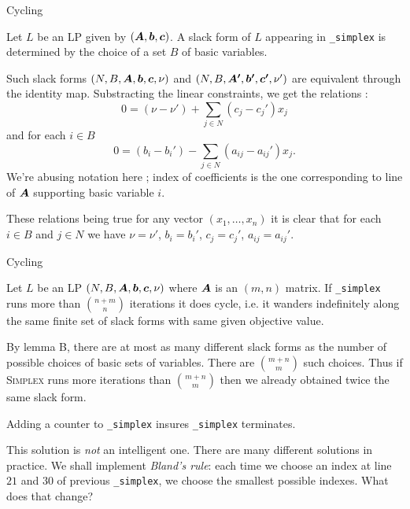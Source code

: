 \documentclass[aspectratio = 169]{beamer}
\begin{document}
    \begin{frame}{Cycling}
        \begin{lem}[$\bs{B}$]
          Let $L$ be an LP given by $(\boldsymbol{A}, \boldsymbol{b}, \boldsymbol{c})$. A
          slack form of $L$ appearing in \texttt{_simplex}
          is determined by the choice of a set $B$ of basic variables.
        \end{lem}
        \pause
        \setlength\columnseprule{.1pt}
        \begin{multicols}{2}
            \begin{demo}
              Such slack forms $(N, B, \boldsymbol{A}, \boldsymbol{b}, \boldsymbol{c}, \nu)$
              and $(N, B, \boldsymbol{A'}, \boldsymbol{b'}, \boldsymbol{c'}, \nu')$ are
              equivalent through the identity map.  \pause
              Substracting the linear constraints, we get the
              relations :
              \[
              0 = (\nu - \nu') + \sum_{j \in N} (c_j - c_j')x_j
              \]
              and for each $i \in B$
              \[
              0 = (b_i - b_i') - \sum_{j \in N} (a_{ij} - a_{ij}')x_j.
              \]
              We're abusing notation here ; index of coefficients is
              the one corresponding to line of $\boldsymbol{A}$ supporting
              basic variable $i$.

              \pause These relations being true for any vector
              $(x_1, \ldots, x_n)$ it is clear that for each $i \in B$
              and $j \in N$ we have  $\nu = \nu'$, $b_i = b_i'$, $c_j = c_j'$,
              $a_{ij} = a_{ij}'$.
            \end{demo}
        \end{multicols}
    \end{frame}

\begin{frame}{Cycling}
  \begin{prop}[\textbf{C}]
    Let $L$ be an LP $(N, B, \boldsymbol{A}, \boldsymbol{b}, \boldsymbol{c}, \nu)$ where
    $\boldsymbol{A}$ is an $(m, n)$ matrix. If \texttt{_simplex}
    runs more than $\binom{n+m}{n}$ iterations it does cycle, i.e. it
    wanders indefinitely along the same finite set of slack forms with
    same given objective value.
  \end{prop}
  \begin{demo}
    By lemma B, there are at most as many different slack forms
    as the number of possible choices of basic sets of
    variables. There are $\binom{m+n}{m}$ such choices. Thus if
    \textsc{Simplex} runs more iterations than $\binom{m+n}{m}$
    then we already obtained twice the same slack form.
  \end{demo}
  \pause
  Adding a counter to \texttt{_simplex} insures
  \texttt{_simplex} terminates.

  \pause
  \begin{rem}
    This solution is \alert{\emph{not}} an intelligent one. There are
    many different solutions in practice.  We shall implement
    \emph{Bland's rule}: each time we choose an index at line $21$ and
    $30$ of previous \texttt{_simplex}, we choose the
    smallest possible indexes. What does that change?
  \end{rem}
\end{frame}
\end{document}
